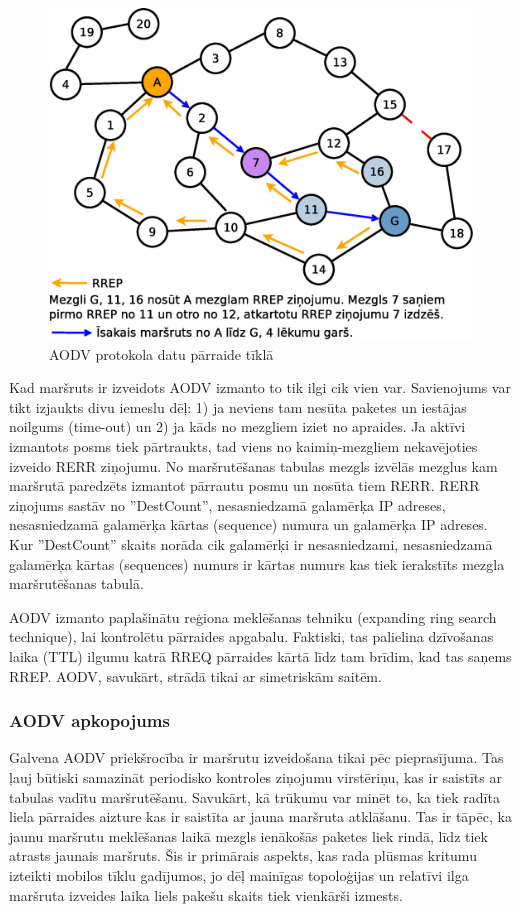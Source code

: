 \begin{figure}[!htb]
\centering
\includegraphics[scale=0.35]{./graph/aodv}
 \caption{AODV protokola datu pārraide tīklā}
\label{fig:aodv}
\end{figure}

Kad maršruts ir izveidots AODV izmanto to tik ilgi cik vien var. Savienojums var tikt izjaukts divu iemeslu dēļ: 1) ja neviens tam nesūta paketes un iestājas noilgums (time-out) un 2) ja kāds no mezgliem iziet no apraides. Ja aktīvi izmantots posms tiek pārtraukts, tad viens no kaimiņ-mezgliem nekavējoties izveido RERR ziņojumu. No maršrutēšanas tabulas mezgls izvēlās mezglus kam maršrutā paredzēts izmantot pārrautu posmu un nosūta tiem RERR. RERR ziņojums sastāv no ''DestCount'', nesasniedzamā galamērķa IP adreses, nesasniedzamā galamērķa kārtas (sequence) numura un galamērķa IP adreses. Kur ''DestCount'' skaits norāda cik galamērķi ir nesasniedzami, nesasniedzamā galamērķa kārtas (sequences) numurs ir kārtas numurs kas tiek ierakstīts mezgla maršrutēšanas tabulā.


AODV izmanto paplašinātu reģiona meklēšanas tehniku (expanding ring search technique), lai kontrolētu pārraides apgabalu. Faktiski, tas palielina dzīvošanas laika (TTL) ilgumu katrā RREQ pārraides kārtā līdz tam brīdim, kad tas saņems RREP. AODV, savukārt, strādā tikai ar simetriskām saitēm.

\subsubsection{AODV apkopojums}
Galvena AODV priekšrocība ir maršrutu izveidošana tikai pēc pieprasījuma. Tas ļauj būtiski samazināt periodisko kontroles ziņojumu virstēriņu, kas ir saistīts ar tabulas vadītu maršrutēšanu. Savukārt, kā trūkumu var minēt to, ka tiek radīta liela pārraides aizture kas ir saistīta ar jauna maršruta atklāšanu. Tas ir tāpēc, ka jaunu maršrutu meklēšanas laikā mezgls ienākošās paketes liek rindā, līdz tiek atrasts jaunais maršruts. Šis ir primārais aspekts, kas rada plūsmas kritumu izteikti mobilos tīklu gadījumos, jo dēļ mainīgas topoloģijas un relatīvi ilga  maršruta izveides laika liels pakešu skaits tiek vienkārši izmests.

